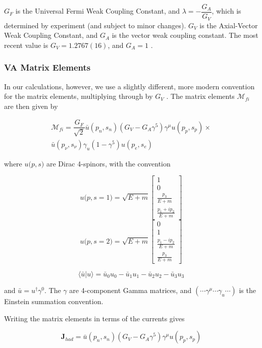 \documentclass[%
 aip,
 jmp,%
 amsmath,amssymb,
 reprint,%
]{revtex4-1}
\begin{document}
$G_{F}$ is the Universal Fermi Weak Coupling Constant, and $\lambda=-\dfrac{G_{A}}{G_{V}}$, which is determined by experiment (and subject to minor changes). 
 $G_{V}$ is the Axial-Vector Weak Coupling Constant, and $G_{A}$ is the vector weak coupling
constant.  The most recent value is $G_{V}=1.2767(16)$, and $G_{A}=1$ \cite{vacoupling}.


\subsubsection{VA Matrix Elements}

In our calculations, however, we use a slightly different, more modern convention for the matrix elements, multiplying through by $G_{V}$ \cite{zuber}.   The matrix elements $\mathcal{M}_{fi}$ are then given by

\begin{multline}
\mathcal{M}_{fi}=\dfrac{G_{F}}{\sqrt{2}}\bar{u}(p_{n},s_{n})(G_{V}-G_{A}\gamma^{5})\gamma^{\mu}u(p_{p},s_{p})\times \\
\bar{u}(p_{\nu},s_{\nu})\gamma_{u}(1-\gamma^{5})u(p_{e},s_{e})
\end{multline}

where $u{(p},s)$ are Dirac 4-spinors, with the convention

$$u{(p},s=1)=\sqrt{E+m}\left[\begin{array}{c}
1\\
0\\
\frac{p_{3}}{E+m}\\
\frac{p_{1}+ip_{2}}{E+m}
\end{array}\right]$$
$$u{(p},s=2)=\sqrt{E+m}\left[\begin{array}{c}
0\\
1\\
\frac{p_{1}-ip_{2}}{E+m}\\
\frac{p_{3}}{E+m}
\end{array}\right]$$

$$\langle\bar{u}|u\rangle=\bar{u}_{0}u_{0}-\bar{u}_{1}u_{1}-\bar{u}_{2}u_{2}-\bar{u}_{3}u_{3}$$

and $\bar{u}=u^{\dagger}\gamma^{0}$.  The $\gamma$ are 4-component Gamma matrices, and  $(\cdots\gamma^{\mu}\cdots\gamma_{u}\cdots)$ is the Einstein summation convention. 

Writing the matrix elements in terms of the currents gives

$$\mathbf{J}_{had}=\bar{u}(p_{n},s_{n})(G_{V}-G_{A}\gamma^{5})\gamma^{\mu}u(p_{p},s_{p})$$
\end{document}
